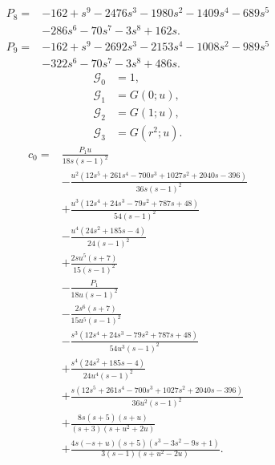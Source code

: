 \begin{align}
P_{8}={}&-162+s^{9}- 2476 s^{3}- 1980 s^{2}- 1409 s^{4}- 689 s^{5}\\
&- 286 s^{6}- 70 s^{7}- 3 s^{8}+162 s.
\end{align}
\begin{align}
P_{9}={}&-162+s^{9}- 2692 s^{3}- 2153 s^{4}- 1008 s^{2}- 989 s^{5}\\
&- 322 s^{6}- 70 s^{7}- 3 s^{8}+486 s.
\end{align}
\begin{align}
\mathcal G_{0}&=1,\\
\mathcal G_{1}&=G(0;u),\\
\mathcal G_{2}&=G(1;u),\\
\mathcal G_{3}&=G(r^{2};u).
\end{align}
\begin{align}
c_{0}={}&\frac{P_{1} u}{18 s \left(s - 1\right)^{2}}\\
&- \frac{u^{2} \left(12 s^{5} + 261 s^{4} - 700 s^{3} + 1027 s^{2} + 2040 s - 396\right)}{36 s \left(s - 1\right)^{2}}\\
&+\frac{u^{3} \left(12 s^{4} + 24 s^{3} - 79 s^{2} + 787 s + 48\right)}{54 \left(s - 1\right)^{2}}\\
&- \frac{u^{4} \left(24 s^{2} + 185 s - 4\right)}{24 \left(s - 1\right)^{2}}\\
&+\frac{2 s u^{5} \left(s + 7\right)}{15 \left(s - 1\right)^{2}}\\
&- \frac{P_{1}}{18 u \left(s - 1\right)^{2}}\\
&- \frac{2 s^{6} \left(s + 7\right)}{15 u^{5} \left(s - 1\right)^{2}}\\
&- \frac{s^{3} \left(12 s^{4} + 24 s^{3} - 79 s^{2} + 787 s + 48\right)}{54 u^{3} \left(s - 1\right)^{2}}\\
&+\frac{s^{4} \left(24 s^{2} + 185 s - 4\right)}{24 u^{4} \left(s - 1\right)^{2}}\\
&+\frac{s \left(12 s^{5} + 261 s^{4} - 700 s^{3} + 1027 s^{2} + 2040 s - 396\right)}{36 u^{2} \left(s - 1\right)^{2}}\\
&+\frac{8 s \left(s + 5\right) \left(s + u\right)}{\left(s + 3\right) \left(s + u^{2} + 2 u\right)}\\
&+\frac{4 s \left(- s + u\right) \left(s + 5\right) \left(s^{3} - 3 s^{2} - 9 s + 1\right)}{3 \left(s - 1\right) \left(s + u^{2} - 2 u\right)}.
\end{align}
